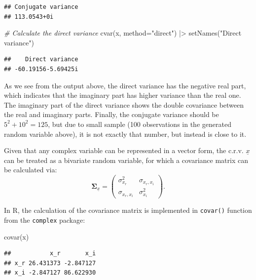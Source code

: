 \documentclass[
]{book}
\newenvironment{Shaded}{\begin{snugshade}}{\end{snugshade}}
\newcommand{\AttributeTok}[1]{\textcolor[rgb]{0.77,0.63,0.00}{#1}}
\newcommand{\CommentTok}[1]{\textcolor[rgb]{0.56,0.35,0.01}{\textit{#1}}}
\newcommand{\FunctionTok}[1]{\textcolor[rgb]{0.00,0.00,0.00}{#1}}
\newcommand{\NormalTok}[1]{#1}
\newcommand{\SpecialCharTok}[1]{\textcolor[rgb]{0.00,0.00,0.00}{#1}}
\newcommand{\StringTok}[1]{\textcolor[rgb]{0.31,0.60,0.02}{#1}}
\begin{document}
\begin{verbatim}
## Conjugate variance 
## 113.0543+0i
\end{verbatim}

\begin{Shaded}
\begin{Highlighting}[]
\CommentTok{\# Calculate the direct variance}
\FunctionTok{cvar}\NormalTok{(x, }\AttributeTok{method=}\StringTok{"direct"}\NormalTok{) }\SpecialCharTok{|\textgreater{}}
    \FunctionTok{setNames}\NormalTok{(}\StringTok{"Direct variance"}\NormalTok{)}
\end{Highlighting}
\end{Shaded}

\begin{verbatim}
##    Direct variance 
## -60.19156-5.69425i
\end{verbatim}

As we see from the output above, the direct variance has the negative real part, which indicates that the imaginary part has higher variance than the real one. The imaginary part of the direct variance shows the double covariance between the real and imaginary parts. Finally, the conjugate variance should be \(5^2 + 10^2 = 125\), but due to small sample (100 observations in the generated random variable above), it is not exactly that number, but instead is close to it.

Given that any complex variable can be represented in a vector form, the c.r.v. \(\underline{x}\) can be treated as a bivariate random variable, for which a covariance matrix can be calculated via:
\begin{equation}
    \boldsymbol{\Sigma}_{\underline{x}} = \begin{pmatrix} \sigma_{x_r}^2 & \sigma_{x_r, x_i} \\ \sigma_{x_r, x_i} & \sigma_{x_i}^2 \end{pmatrix} .
    \label{eq:crvMomentSecondVarianceMatrix}
\end{equation}

In R, the calculation of the covariance matrix is implemented in \texttt{covar()} function from the \texttt{complex} package:

\begin{Shaded}
\begin{Highlighting}[]
\FunctionTok{covar}\NormalTok{(x)}
\end{Highlighting}
\end{Shaded}

\begin{verbatim}
##           x_r       x_i
## x_r 26.431373 -2.847127
## x_i -2.847127 86.622930
\end{verbatim}
\end{document}
